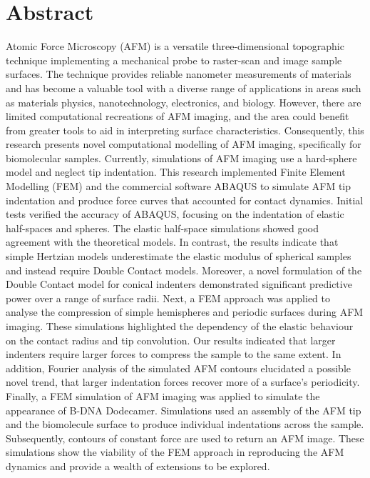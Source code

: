 \section*{Abstract}

Atomic Force Microscopy (AFM) is a versatile three-dimensional topographic technique implementing a mechanical probe to raster-scan and image sample surfaces. The technique provides reliable nanometer measurements of materials \cite{nagashima1996nanoscopic, kempf1998nanohardness,goken1999microstructural,yamamoto2000afm} and has become a valuable tool with a diverse range of applications in areas such as materials physics, nanotechnology, electronics, and biology\cite{JALILI2004907,SANTOS2004133, goken1999microstructural}. However,   there are limited computational recreations of AFM imaging, and the area could benefit from greater tools to aid in interpreting surface characteristics. Consequently, this research presents novel computational modelling of AFM imaging, specifically for biomolecular samples. Currently, simulations of AFM imaging use a hard-sphere model and neglect tip indentation\cite{amyot2020bioafmviewer}. This research implemented Finite Element Modelling (FEM) and the commercial software ABAQUS to simulate AFM tip indentation and produce force curves that accounted for contact dynamics. Initial tests verified the accuracy of ABAQUS, focusing on the indentation of elastic half-spaces and spheres. The elastic half-space simulations showed good agreement with the theoretical models. In contrast, the results indicate that simple Hertzian models underestimate the elastic modulus of spherical samples and instead require Double Contact models. Moreover, a novel formulation of the Double Contact model for conical indenters demonstrated significant predictive power over a range of surface radii. Next, a FEM approach was applied to analyse the compression of simple hemispheres and periodic surfaces during AFM imaging. These simulations highlighted the dependency of the elastic behaviour on the contact radius and tip convolution. Our results indicated that larger indenters require larger forces to compress the sample to the same extent. In addition, Fourier analysis of the simulated AFM contours elucidated a possible novel trend, that larger indentation forces recover more of a surface's periodicity. Finally, a FEM simulation of AFM imaging was applied to simulate the appearance of B-DNA Dodecamer. Simulations used an assembly of the AFM tip and the biomolecule surface to produce individual indentations across the sample. Subsequently, contours of constant force are used to return an AFM image. These simulations show the viability of the FEM approach in reproducing the AFM dynamics and provide a wealth of extensions to be explored.
